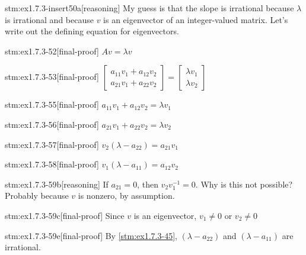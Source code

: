 \begin{stm}{stm:ex1.7.3-insert50a}[reasoning]
My guess is that the slope is irrational because $\lambda$ is irrational and because $v$ is an eigenvector of an integer-valued matrix. Let's write out the defining equation for eigenvectors.
\end{stm}

\begin{stm}{stm:ex1.7.3-52}[final-proof]
$A v = \lambda v$
\end{stm}

\begin{stm}{stm:ex1.7.3-53}[final-proof]
$\begin{bmatrix} a_{11}v_1 + a_{12}v_2 \\ a_{21}v_1 + a_{22}v_2 \end{bmatrix} = \begin{bmatrix} \lambda v_1 \\ \lambda v_2 \end{bmatrix}$
\end{stm}

\begin{stm}{stm:ex1.7.3-55}[final-proof]
$a_{11}v_1 + a_{12}v_2 = \lambda v_1$
\end{stm}

\begin{stm}{stm:ex1.7.3-56}[final-proof]
$a_{21}v_1 + a_{22}v_2 = \lambda v_2$
\end{stm}

\begin{stm}{stm:ex1.7.3-57}[final-proof]
$v_2(\lambda - a_{22}) = a_{21}v_1$
\end{stm}

\begin{stm}{stm:ex1.7.3-58}[final-proof]
$v_1(\lambda - a_{11}) = a_{12}v_2$
\end{stm}

\begin{stm}{stm:ex1.7.3-59b}[reasoning]
If $a_{21} = 0$, then $v_2 v_1^{-1} = 0$. Why is this not possible? Probably because $v$ is nonzero, by assumption.
\end{stm}

\begin{stm}{stm:ex1.7.3-59c}[final-proof]
Since $v$ is an eigenvector, $v_1 \ne 0$ or $v_2 \ne 0$
\end{stm}

\begin{stm}{stm:ex1.7.3-59e}[final-proof]
By \ref{stm:ex1.7.3-45}, $(\lambda - a_{22})$ and $(\lambda - a_{11})$ are irrational.
\end{stm}

